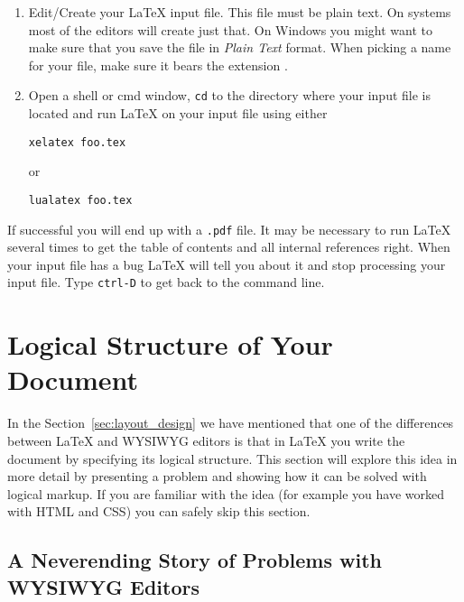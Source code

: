 \begin{enumerate}
  \item Edit/Create your \LaTeX{} input file. This file must be plain text.  On
        \Unix{} systems most of the editors will create just that. On Windows
        you might want to make sure that you save the file in \emph{Plain Text}
        format. When picking a name for your file, make sure it bears the
        extension .

  \item Open a shell or cmd window, \texttt{cd} to the directory where your
        input file is located and run \LaTeX{} on your input file using either
        \begin{lscommand}
          \verb+xelatex foo.tex+
        \end{lscommand}
        or
        \begin{lscommand}
          \verb+lualatex foo.tex+
        \end{lscommand}
\end{enumerate}

If successful you will end up with a \texttt{.pdf} file. It may be necessary to
run \LaTeX{} several times to get the table of contents and all internal
references right. When your input file has a bug \LaTeX{} will tell you about
it and stop processing your input file. Type \texttt{ctrl-D} to get back to the
command line.

\section{Logical Structure of Your Document}

In the Section~\ref{sec:layout_design} we have mentioned that one of the
differences between \LaTeX{} and WYSIWYG editors is that in \LaTeX{} you write
the document by specifying its logical structure. This section will explore
this idea in more detail by presenting a problem and showing how it can be
solved with logical markup. If you are familiar with the idea (for example you
have worked with HTML and CSS) you can safely skip this section.

\subsection{A Neverending Story of Problems with WYSIWYG Editors}

